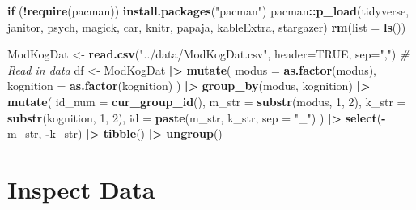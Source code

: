\documentclass[
  doc,floatsintext]{apa6}
\newenvironment{Shaded}{\begin{snugshade}}{\end{snugshade}}
\newcommand{\AttributeTok}[1]{\textcolor[rgb]{0.13,0.29,0.53}{#1}}
\newcommand{\CommentTok}[1]{\textcolor[rgb]{0.56,0.35,0.01}{\textit{#1}}}
\newcommand{\ConstantTok}[1]{\textcolor[rgb]{0.56,0.35,0.01}{#1}}
\newcommand{\ControlFlowTok}[1]{\textcolor[rgb]{0.13,0.29,0.53}{\textbf{#1}}}
\newcommand{\DecValTok}[1]{\textcolor[rgb]{0.00,0.00,0.81}{#1}}
\newcommand{\FunctionTok}[1]{\textcolor[rgb]{0.13,0.29,0.53}{\textbf{#1}}}
\newcommand{\NormalTok}[1]{#1}
\newcommand{\OtherTok}[1]{\textcolor[rgb]{0.56,0.35,0.01}{#1}}
\newcommand{\SpecialCharTok}[1]{\textcolor[rgb]{0.81,0.36,0.00}{\textbf{#1}}}
\newcommand{\StringTok}[1]{\textcolor[rgb]{0.31,0.60,0.02}{#1}}
\begin{document}
\begin{Shaded}
\begin{Highlighting}[]
\ControlFlowTok{if}\NormalTok{ (}\SpecialCharTok{!}\FunctionTok{require}\NormalTok{(pacman)) }\FunctionTok{install.packages}\NormalTok{(}\StringTok{"pacman"}\NormalTok{)}
\NormalTok{pacman}\SpecialCharTok{::}\FunctionTok{p\_load}\NormalTok{(tidyverse, janitor, psych, magick, }
\NormalTok{               car, knitr, papaja, kableExtra, stargazer)}
\FunctionTok{rm}\NormalTok{(}\AttributeTok{list =} \FunctionTok{ls}\NormalTok{())}

\NormalTok{ModKogDat }\OtherTok{\textless{}{-}} \FunctionTok{read.csv}\NormalTok{(}\StringTok{"../data/ModKogDat.csv"}\NormalTok{, }\AttributeTok{header=}\ConstantTok{TRUE}\NormalTok{, }\AttributeTok{sep=}\StringTok{","}\NormalTok{) }
\CommentTok{\# Read in data}
\NormalTok{df }\OtherTok{\textless{}{-}}\NormalTok{ ModKogDat }\SpecialCharTok{|\textgreater{}} 
  \FunctionTok{mutate}\NormalTok{(}
    \AttributeTok{modus =} \FunctionTok{as.factor}\NormalTok{(modus),}
    \AttributeTok{kognition =} \FunctionTok{as.factor}\NormalTok{(kognition)}
\NormalTok{    ) }\SpecialCharTok{|\textgreater{}} 
  \FunctionTok{group\_by}\NormalTok{(modus, kognition) }\SpecialCharTok{|\textgreater{}} 
  \FunctionTok{mutate}\NormalTok{(}
    \AttributeTok{id\_num =} \FunctionTok{cur\_group\_id}\NormalTok{(),}
    \AttributeTok{m\_str =} \FunctionTok{substr}\NormalTok{(modus, }\DecValTok{1}\NormalTok{, }\DecValTok{2}\NormalTok{),}
    \AttributeTok{k\_str =} \FunctionTok{substr}\NormalTok{(kognition, }\DecValTok{1}\NormalTok{, }\DecValTok{2}\NormalTok{),}
    \AttributeTok{id =} \FunctionTok{paste}\NormalTok{(m\_str, k\_str, }\AttributeTok{sep =} \StringTok{"\_"}\NormalTok{)}
\NormalTok{  ) }\SpecialCharTok{|\textgreater{}} 
  \FunctionTok{select}\NormalTok{(}\SpecialCharTok{{-}}\NormalTok{m\_str, }\SpecialCharTok{{-}}\NormalTok{k\_str) }\SpecialCharTok{|\textgreater{}} 
  \FunctionTok{tibble}\NormalTok{() }\SpecialCharTok{|\textgreater{}} 
  \FunctionTok{ungroup}\NormalTok{() }
\end{Highlighting}
\end{Shaded}

\clearpage

\hypertarget{inspect-data}{%
\section{Inspect Data}\label{inspect-data}}
\end{document}
